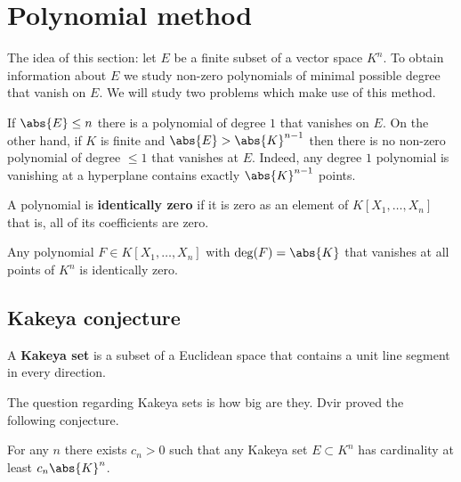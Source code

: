 \documentclass[12pt, a4paper]{article}
\begin{document}
\section{Polynomial method}

\begin{mdnote}
    The idea of this section: let \(E\) be a finite subset of a vector space \(K^n\). To obtain information about \(E\) we study non-zero polynomials of minimal possible degree that vanish on \(E\). We will study two problems which make use of this method.
\end{mdnote}

\begin{mdexample}
    If \(\abs{E}\leq n\) there is a polynomial of degree \(1\) that vanishes on \(E\). On the other hand, if \(K\) is finite and \(\abs{E}>\abs{K}^{n-1}\) then there is no non-zero polynomial of degree \(\leq 1\) that vanishes at \(E\). Indeed, any degree \(1\) polynomial is vanishing at a hyperplane contains exactly \(\abs{K}^{n-1}\) points.
\end{mdexample}

\begin{definition}
    A polynomial is \textbf{identically zero} if it is zero as an element of \(K[X_1,\ldots,X_n]\) that is, all of its coefficients are zero.
\end{definition}

\begin{mdexample}
    Any polynomial \(F \in K[X_1,\ldots,X_n]\) with \(\deg(F)=\abs{K}\) that vanishes at all points of \(K^n\) is identically zero.
\end{mdexample}

\subsection{Kakeya conjecture}

\begin{definition}
    A \textbf{Kakeya set} is a subset of a Euclidean space that contains a unit line segment in every direction.
\end{definition}

\begin{mdnote}
    The question regarding Kakeya sets is how big are they. Dvir proved the following conjecture. 

    For any \(n\) there exists \(c_n>0\) such that any Kakeya set \(E \subset K^n\) has cardinality at least \(c_n\abs{K}^n\).
\end{mdnote}
\end{document}
